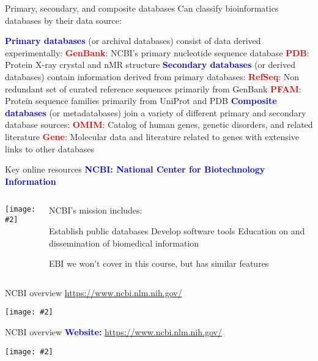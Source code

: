 \documentclass{beamer}
\renewcommand{\c}[1]{\begin{center}#1\end{center}}
\newcommand{\blu}[1]{\textcolor{blue}{\textbf{#1}}}
\newcommand{\red}[1]{\textcolor{red}{\textbf{#1}}}
\newcommand{\gr}[2][.95]{\c{\texttt{[image: \#2]}}}
\begin{document}
\begin{frame}{Primary, secondary, and composite databases}
Can classify bioinformatics databases by their data source:\\
\begin{outline}
\1[] \blu{Primary databases} (or archival databases) consist of data derived experimentally:
    \2[] \red{GenBank}: NCBI’s primary nucleotide sequence database
    \2[] \red{PDB}: Protein X-ray crystal and nMR structure
\1[] \blu{Secondary databases} (or derived databases) contain information derived from primary databases:
    \2[] \red{RefSeq}: Non redundant set of curated reference sequences primarily from GenBank
    \2[] \red{PFAM}: Protein sequence families primarily from UniProt and PDB
\1[] \blu{Composite databases} (or metadatabases) join a variety of different primary and secondary database sources:
    \2[] \red{OMIM}: Catalog of human genes, genetic disorders, and related literature
    \2[] \red{Gene}: Molecular data and literature related to genes with extensive links to other databases
\end{outline}
\end{frame}

\begin{frame}{Key online resources}
\blu{NCBI: National Center for Biotechnology Information}\\
\biskip
\begin{columns}
\begin{column}{0.5\textwidth}
    \gr{l2_figs/s10_dbs.png}
\end{column}
\begin{column}{0.5\textwidth}
NCBI’s mission includes:
\begin{outline}
\1 Establish public databases 
\1 Develop software tools 
\1 Education on and dissemination of biomedical information
\end{outline}
EBI we won’t cover in this course, but has similar features
\end{column}
\end{columns}
\end{frame}

\begin{frame}{NCBI overview}
    \url{https://www.ncbi.nlm.nih.gov/}
    \gr{l2_figs/s11_ncbi.png}
\end{frame}

\begin{frame}{NCBI overview}
    \blu{Website:} \url{https://www.ncbi.nlm.nih.gov/}
    \gr{l2_figs/s11_ncbi2.png}
\end{frame}
\end{document}
